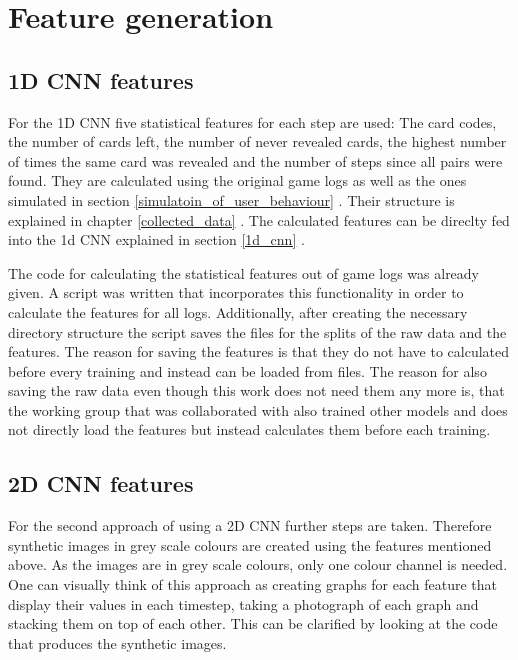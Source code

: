 \newpage

\section{Feature generation}
\label{feature_generation}

\subsection{1D CNN features}
\label{1d_cnn_features}
For the 1D CNN five statistical features for each step are used: The card codes, the number of cards left, the number of never revealed cards,  the highest number of times the same card was revealed and the number of steps since all pairs were found. They are calculated using the original game logs as well as the ones simulated in section \ref{simulatoin_of_user_behaviour} . Their structure is explained in chapter \ref{collected_data} . The calculated features can be direclty fed into the 1d CNN explained in section \ref{1d_cnn} . 

The code for calculating the statistical features out of game logs was already given. A script was written that incorporates this functionality in order to calculate the features for all logs. Additionally, after creating the necessary directory structure the script saves the files for the splits of the raw data and the features. The reason for saving the features is that they do not have to calculated before every training and instead can be loaded from files. The reason for also saving the raw data even though this work does not need them any more is, that the working group that was collaborated with also trained other models and does not directly load the features but instead calculates them before each training.

\newpage

\subsection{2D CNN features}
\label{2d_cnn_features}

For the second approach of using a 2D CNN further steps are taken. Therefore synthetic images in grey scale colours are created using the features mentioned above. As the images are in grey scale colours, only one colour channel is needed. One can visually think of this approach as creating graphs for each feature that display their values in each timestep, taking a photograph of each graph and stacking them on top of each other. This can be clarified by looking at the code that produces the synthetic images. \\ 

